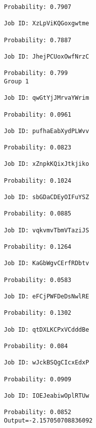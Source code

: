 \documentclass[11pt]{article}
\begin{document}
\begin{Verbatim}[commandchars=\\\{\}]
Probability: 0.7907

Job ID: XzLpViKQGoxgwtme

Probability: 0.7887

Job ID: JhejPCUoxOwfNrzC

Probability: 0.799
Group 1

Job ID: qwGtYjJMrvaYWrim

Probability: 0.0961

Job ID: pufhaEabXydPLWvv

Probability: 0.0823

Job ID: xZnpkKQixJtkjiko

Probability: 0.1024

Job ID: sbGDaCDEyOIFuYSZ

Probability: 0.0885

Job ID: vqkvmvTbmVTaziJS

Probability: 0.1264

Job ID: KaGbWgvCErfRDbtv

Probability: 0.0583

Job ID: eFCjPWFDeDsNwlRE

Probability: 0.1302

Job ID: qtDXLKCPxVCdddBe

Probability: 0.084

Job ID: wJckBSQgCIcxEdxP

Probability: 0.0909

Job ID: IOEJeabiwOplRTUw

Probability: 0.0852
Output=-2.157050708836092

    \end{Verbatim}
\end{document}
